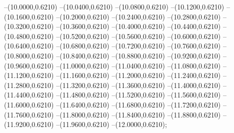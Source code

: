 {	--(10.0000,0.6210)
	--(10.0400,0.6210)
	--(10.0800,0.6210)
	--(10.1200,0.6210)
	--(10.1600,0.6210)
	--(10.2000,0.6210)
	--(10.2400,0.6210)
	--(10.2800,0.6210)
	--(10.3200,0.6210)
	--(10.3600,0.6210)
	--(10.4000,0.6210)
	--(10.4400,0.6210)
	--(10.4800,0.6210)
	--(10.5200,0.6210)
	--(10.5600,0.6210)
	--(10.6000,0.6210)
	--(10.6400,0.6210)
	--(10.6800,0.6210)
	--(10.7200,0.6210)
	--(10.7600,0.6210)
	--(10.8000,0.6210)
	--(10.8400,0.6210)
	--(10.8800,0.6210)
	--(10.9200,0.6210)
	--(10.9600,0.6210)
	--(11.0000,0.6210)
	--(11.0400,0.6210)
	--(11.0800,0.6210)
	--(11.1200,0.6210)
	--(11.1600,0.6210)
	--(11.2000,0.6210)
	--(11.2400,0.6210)
	--(11.2800,0.6210)
	--(11.3200,0.6210)
	--(11.3600,0.6210)
	--(11.4000,0.6210)
	--(11.4400,0.6210)
	--(11.4800,0.6210)
	--(11.5200,0.6210)
	--(11.5600,0.6210)
	--(11.6000,0.6210)
	--(11.6400,0.6210)
	--(11.6800,0.6210)
	--(11.7200,0.6210)
	--(11.7600,0.6210)
	--(11.8000,0.6210)
	--(11.8400,0.6210)
	--(11.8800,0.6210)
	--(11.9200,0.6210)
	--(11.9600,0.6210)
	--(12.0000,0.6210);
}
